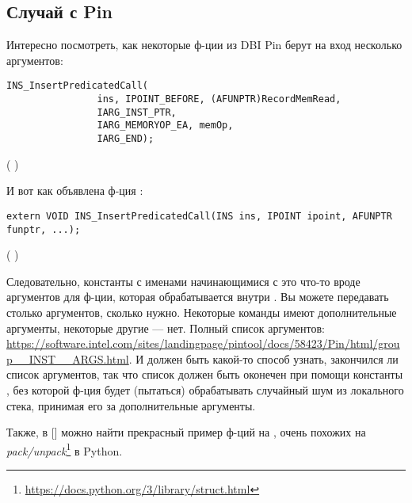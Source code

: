 \subsection{Случай с Pin}

Интересно посмотреть, как некоторые ф-ции из \ac{DBI} Pin берут на вход несколько аргументов:

\begin{lstlisting}[style=customc]
            INS_InsertPredicatedCall(
                ins, IPOINT_BEFORE, (AFUNPTR)RecordMemRead,
                IARG_INST_PTR,
                IARG_MEMORYOP_EA, memOp,
                IARG_END);
\end{lstlisting}
(  )

И вот как объявлена ф-ция :

\begin{lstlisting}[style=customc]
extern VOID INS_InsertPredicatedCall(INS ins, IPOINT ipoint, AFUNPTR funptr, ...);
\end{lstlisting}
(  )

Следовательно, константы с именами начинающимися с  это что-то вроде аргументов для ф-ции,
которая обрабатывается внутри .
Вы можете передавать столько аргументов, сколько нужно.
Некоторые команды имеют дополнительные аргументы, некоторые другие --- нет.
Полный список аргументов:
\url{https://software.intel.com/sites/landingpage/pintool/docs/58423/Pin/html/group__INST__ARGS.html}.
И должен быть какой-то способ узнать, закончился ли список аргументов, так что список должен быть оконечен при помощи
константы , без которой ф-ция будет (пытаться) обрабатывать случайный шум из локального стека,
принимая его за дополнительные аргументы.

Также, в [\RobPikePractice] можно найти прекрасный пример ф-ций на \CCpp{}, очень похожих на 
\emph{pack/unpack}\footnote{\url{https://docs.python.org/3/library/struct.html}} в Python.

